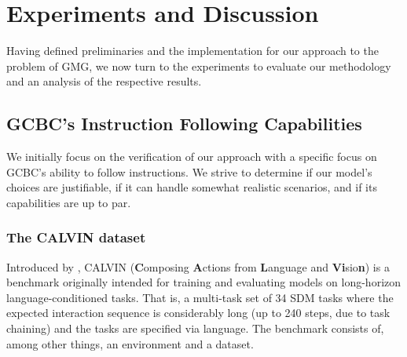 \documentclass[../main.tex]{subfiles}
\begin{document}
\chapter{Experiments and Discussion}\label{exp:chap}

Having defined preliminaries and the implementation for our approach to the problem of GMG, we now
turn to the experiments to evaluate our methodology and an analysis of the respective results.

\section{GCBC's Instruction Following Capabilities}

We initially focus on the verification of our approach with a specific focus on GCBC's ability to
follow instructions. We strive to determine if our model's choices are justifiable, if it can handle
somewhat realistic scenarios, and if its capabilities are up to par.

\subsection{The CALVIN dataset}

Introduced by \citet{mees_calvin_2022}, CALVIN (\textbf{C}omposing \textbf{A}ctions from
\textbf{L}anguage and \textbf{Vi}sio\textbf{n}) is a benchmark originally intended for training and
evaluating models on long-horizon language-conditioned tasks. That is, a multi-task set of 34 SDM tasks where the expected interaction sequence is considerably long (up to 240 steps, due to task
chaining) and the tasks are specified via language. The benchmark consists of, among other things,
an environment and a dataset.
\end{document}
